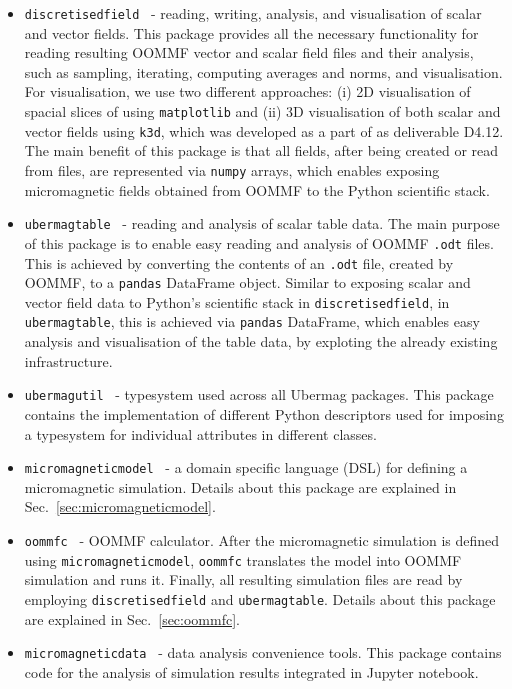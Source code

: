 \documentclass{deliverablereport}
\begin{document}
\begin{itemize}
\item \texttt{discretisedfield}~\cite{discretisedfield} - reading,
  writing, analysis, and visualisation of scalar and vector
  fields. This package provides all the necessary functionality for
  reading resulting OOMMF vector and scalar field files and their
  analysis, such as sampling, iterating, computing averages and norms,
  and visualisation. For visualisation, we use two different
  approaches: (i) 2D visualisation of spacial slices of using
  \texttt{matplotlib} and (ii) 3D visualisation of both scalar and
  vector fields using \texttt{k3d}, which was developed as a part of
  \ODK as deliverable D4.12. The main benefit of this package is
  that all fields, after being created or read from files, are
  represented via \texttt{numpy} arrays, which enables exposing
  micromagnetic fields obtained from OOMMF to the Python scientific
  stack.
\item \texttt{ubermagtable}~\cite{ubermagtable} - reading and analysis
  of scalar table data. The main purpose of this package is to enable
  easy reading and analysis of OOMMF \texttt{.odt} files. This is
  achieved by converting the contents of an \texttt{.odt} file,
  created by OOMMF, to a \texttt{pandas} DataFrame object. Similar to
  exposing scalar and vector field data to Python's scientific stack
  in \texttt{discretisedfield}, in \texttt{ubermagtable}, this is
  achieved via \texttt{pandas} DataFrame, which enables easy analysis
  and visualisation of the table data, by exploting the already
  existing infrastructure.
\item \texttt{ubermagutil}~\cite{ubermagutil} - typesystem used across all Ubermag
packages. This package contains the implementation of different Python
descriptors used for imposing a typesystem for individual attributes
in different classes.
\item \texttt{micromagneticmodel}~\cite{micromagneticmodel} - a domain
  specific language (DSL) for defining a micromagnetic
  simulation. Details about this package are explained in
  Sec.~\ref{sec:micromagneticmodel}.
\item \texttt{oommfc}~\cite{oommfc} - OOMMF calculator. After the
  micromagnetic simulation is defined using
  \texttt{micromagneticmodel}, \texttt{oommfc} translates the model
  into OOMMF simulation and runs it. Finally, all resulting simulation
  files are read by employing \texttt{discretisedfield} and
  \texttt{ubermagtable}. Details about this package are explained in
  Sec.~\ref{sec:oommfc}.
\item \texttt{micromagneticdata}~\cite{micromagneticdata} - data
  analysis convenience tools. This package contains code for the
  analysis of simulation results integrated in Jupyter notebook.
\end{itemize}
\end{document}
